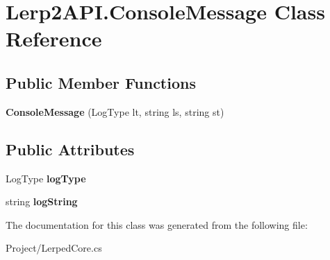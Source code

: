 \hypertarget{class_lerp2_a_p_i_1_1_console_message}{}\section{Lerp2\+A\+P\+I.\+Console\+Message Class Reference}
\label{class_lerp2_a_p_i_1_1_console_message}
\subsection*{Public Member Functions}
\begin{DoxyCompactItemize}
\item 
\mbox{\label{class_lerp2_a_p_i_1_1_console_message_ac57e022f2521be063cace8b4e8fce45e}} 
{\bfseries Console\+Message} (Log\+Type lt, string ls, string st)
\end{DoxyCompactItemize}
\subsection*{Public Attributes}
\begin{DoxyCompactItemize}
\item 
\mbox{\label{class_lerp2_a_p_i_1_1_console_message_aaf16aa394b7815ab52670581601339d3}} 
Log\+Type {\bfseries log\+Type}
\item 
\mbox{\label{class_lerp2_a_p_i_1_1_console_message_a4c1c6779c94fbd0ff785931fb6e20045}} 
string {\bfseries log\+String}
\end{DoxyCompactItemize}


The documentation for this class was generated from the following file\+:\begin{DoxyCompactItemize}
\item 
Project/Lerped\+Core.\+cs\end{DoxyCompactItemize}
